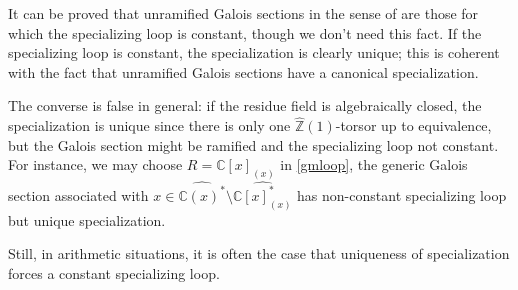 \documentclass[11pt]{amsart}
\theoremstyle{plain}
\theoremstyle{definition}
\newcommand{\1}{\mathbb{1}}
\newcommand{\C}{\mathbb{C}}
\newcommand{\hz}{\hat{\mathbb{Z}}}
\renewcommand{\hat}{\widehat}
\begin{document}
It can be proved that unramified Galois sections in the sense of \cite[Chapter 8]{sti13} are those for which the specializing loop is constant, though we don't need this fact. If the specializing loop is constant, the specialization is clearly unique; this is coherent with the fact that unramified Galois sections have a canonical specialization.

The converse is false in general: if the residue field is algebraically closed, the specialization is unique since there is only one $\hz(1)$-torsor up to equivalence, but the Galois section might be ramified and the specializing loop not constant. For instance, we may choose $R=\C[x]_{(x)}$ in \autoref{gmloop}, the generic Galois section associated with $x\in\hat{\C(x)^{*}}\setminus\hat{\C[x]_{(x)}^{*}}$ has non-constant specializing loop but unique specialization. 

Still, in arithmetic situations, it is often the case that uniqueness of specialization forces a constant specializing loop. 
\end{document}
